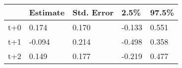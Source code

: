 \begin{tabular}{lllll}
  \toprule
  & Estimate & Std. Error & 2.5\% & 97.5\% \\ 
  \midrule
t+0 & 0.174 & 0.170 & -0.133 & 0.551 \\ 
  t+1 & -0.094 & 0.214 & -0.498 & 0.358 \\ 
  t+2 & 0.149 & 0.177 & -0.219 & 0.477 \\ 
   \bottomrule
\end{tabular}
